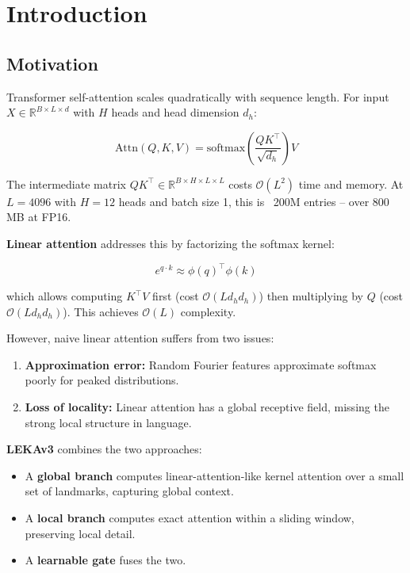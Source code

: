 \section{Introduction}

\subsection{Motivation}

Transformer self-attention scales quadratically with sequence length. For 
input $X \in \mathbb{R}^{B \times L \times d}$ with $H$ heads and head 
dimension $d_h$:

\[
\text{Attn}(Q, K, V) = \text{softmax}\!\left(\frac{Q K^\top}{\sqrt{d_h}}\right) V
\tag{1.1}
\]

The intermediate matrix $QK^\top \in \mathbb{R}^{B \times H \times L \times L}$ 
costs $\mathcal{O}(L^2)$ time and memory. At $L = 4096$ with $H = 12$ heads 
and batch size 1, this is ~200M entries -- over 800 MB at FP16.

\textbf{Linear attention} addresses this by factorizing the softmax kernel:

\[
e^{q \cdot k} \approx \phi(q)^\top \phi(k)
\tag{1.2}
\]

which allows computing $K^\top V$ first (cost $\mathcal{O}(L d_h d_h)$) then 
multiplying by $Q$ (cost $\mathcal{O}(L d_h d_h)$). This achieves $\mathcal{O}(L)$ 
complexity.

However, naive linear attention suffers from two issues:

\begin{enumerate}
\item \textbf{Approximation error:} Random Fourier features approximate softmax poorly
  for peaked distributions.
\item \textbf{Loss of locality:} Linear attention has a global receptive field, missing
  the strong local structure in language.

\end{enumerate}
\textbf{LEKAv3} combines the two approaches:

\begin{itemize}
\item A \textbf{global branch} computes linear-attention-like kernel attention over
  a small set of landmarks, capturing global context.
\item A \textbf{local branch} computes exact attention within a sliding window,
  preserving local detail.
\item A \textbf{learnable gate} fuses the two.

\end{itemize}
